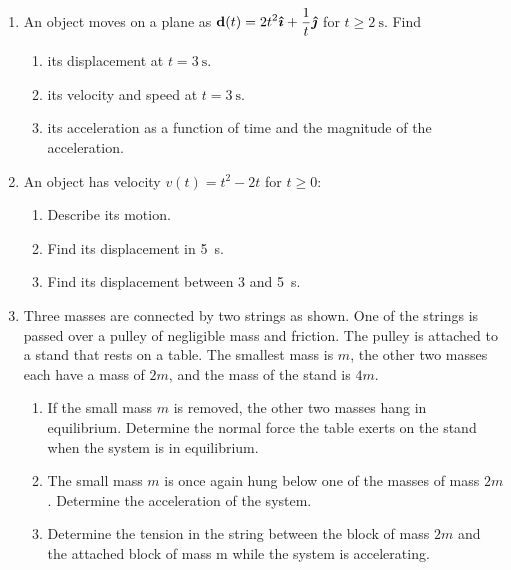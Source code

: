 \documentclass{../../oss-apphys}
\begin{document}
\begin{enumerate}[leftmargin=15pt]
\item An object moves on a plane as
  $\displaystyle \mathbf{d}(t)=2t^2\bm{\hat{\imath}}+\frac{1}{t}\bm{\hat{\jmath}}$
  for $t\geq\SI{2}{\s}$. Find
  \begin{enumerate}[noitemsep,topsep=0pt]
  \item its displacement at $t=\SI{3}{\s}$.
  \item its velocity and speed at $t=\SI{3}{\s}$.
  \item its acceleration as a function of time and the magnitude of the
    acceleration.
  \end{enumerate}
  \vspace{3.5in}
  
\item An object has velocity $v(t)=t^2-2t$ for $t\geq 0$:
  \begin{enumerate}[noitemsep,topsep=0pt]
  \item Describe its motion.
  \item Find its displacement in \SI{5}{\second}.
  \item Find its displacement between \num{3} and \SI{5}{\second}.
  \end{enumerate}
  \newpage
  
\item Three masses are connected by two strings as shown. One of the strings
  is passed over a pulley of negligible mass and friction. The pulley is
  attached to a stand that rests on a table. The smallest mass is $m$, the
  other two masses each have a mass of $2m$, and the mass of the stand is $4m$.
  \begin{enumerate}[leftmargin=18pt]
  \item If the small mass $m$ is removed, the other two masses hang in
    equilibrium. Determine the normal force the table exerts on the stand
    when the system is in equilibrium.
    
  \item The small mass $m$ is once again hung below one of the masses of mass
    $2m$. Determine the acceleration of the system.

  \item Determine the tension in the string between the block of mass $2m$ and
    the attached block of mass m while the system is accelerating.


\end{enumerate}
\end{enumerate}
\end{document}
